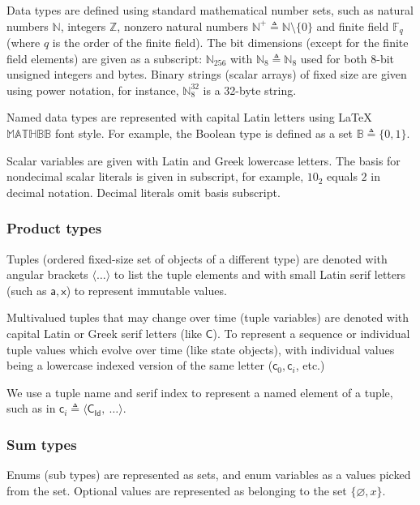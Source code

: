\documentclass[9pt,oneside]{amsart}
\begin{document}
\begin{multicols}{2}
Data types are defined using standard mathematical number sets, such as
natural numbers $\mathbb{N}$, integers $\mathbb{Z}$,
nonzero natural numbers $\mathbb{N}^+ \triangleq \mathbb{N}\setminus\{0\}$
and finite field $\mathbb{F}_q$ (where $q$ is the order of the finite field).
The bit dimensions (except for the finite field elements) are given as a subscript:
$\mathbb{N}_{256}$ with $\mathbb{N}_8 \triangleq \mathbb{N}_8$ used for both 8-bit
unsigned integers and bytes.
Binary strings (scalar arrays) of fixed size are given using power notation,
for instance, $\mathbb{N}_8^{32}$ is a 32-byte string.

Named data types are represented with capital Latin letters using \LaTeX\ $\mathbb{MATHBB}$ font style.
For example, the Boolean type is defined as a set $\mathbb{B} \triangleq \{0, 1\}$.

Scalar variables are given with Latin and Greek lowercase letters.
The basis for nondecimal scalar literals is given in subscript,
for example, $10_2$ equals $2$ in decimal notation. Decimal literals omit basis subscript.

\subsubsection{Product types}

Tuples (ordered fixed-size set of objects of a different type) are denoted with angular brackets
$\langle \ldots \rangle$ to list the tuple elements
and with small Latin serif letters (such as $\mathsf{a}, \mathsf{x}$) to represent immutable values.

Multivalued tuples that may change over time (tuple variables) are denoted
with capital Latin or Greek serif letters (like $\mathsf{C}$). To represent
a sequence or individual tuple values which evolve over time (like state objects),
with individual values being a lowercase indexed version of the same letter
($\mathsf{c}_0, \mathsf{c}_i$, etc.)

We use a tuple name and serif index to represent a named element of a tuple,
such as in $\mathsf{c}_i \triangleq \langle \mathsf{C_{Id}}, \ \ldots \rangle$.

\subsubsection{Sum types}

Enums (sub types) are represented as sets, and enum variables as a values picked from the set.
Optional values are represented as belonging to the set $\{ \varnothing, x \}$.


\end{multicols}
\end{document}
